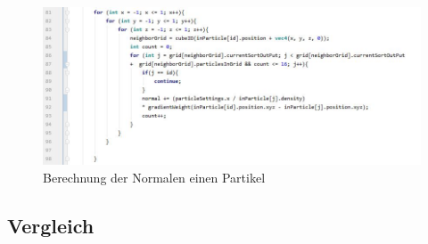 \documentclass[intern,palatino]{cgBA}
\begin{document}
\begin{figure}[H]
	\centering
	\includegraphics[width=1.3\columnwidth]{Bilder/normal.jpg}
	\caption{Berechnung der Normalen einen Partikel}
	\label{img:normal}
\end{figure}


\subsection{Vergleich}\label{vergleich}
\end{document}
